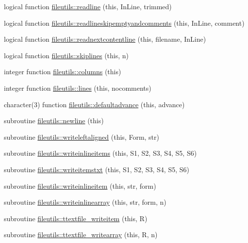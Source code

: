 \begin{DoxyCompactItemize}
\item 
logical function \mbox{\hyperlink{namespacefileutils_affa8ee4edc46a1fcbc9da79877e80724}{fileutils\+::readline}} (this, In\+Line, trimmed)
\item 
logical function \mbox{\hyperlink{namespacefileutils_a8adc28c1f4192183517beb41ccec4287}{fileutils\+::readlineskipemptyandcomments}} (this, In\+Line, comment)
\item 
logical function \mbox{\hyperlink{namespacefileutils_ada6e0a7d8b00d257b6902c5741d737bd}{fileutils\+::readnextcontentline}} (this, filename, In\+Line)
\item 
logical function \mbox{\hyperlink{namespacefileutils_ae9b000065603bdcdab84740b77c43983}{fileutils\+::skiplines}} (this, n)
\item 
integer function \mbox{\hyperlink{namespacefileutils_a91600ec19776dc37a388c71d74c6e0bf}{fileutils\+::columns}} (this)
\item 
integer function \mbox{\hyperlink{namespacefileutils_a55dce72f20c256d70de9529936f7ebd8}{fileutils\+::lines}} (this, nocomments)
\item 
character(3) function \mbox{\hyperlink{namespacefileutils_a8114041129cdfa75aa9d0c0195ff8da1}{fileutils\+::defaultadvance}} (this, advance)
\item 
subroutine \mbox{\hyperlink{namespacefileutils_ae2a0937c572a3a07540ac002f8a620cd}{fileutils\+::newline}} (this)
\item 
subroutine \mbox{\hyperlink{namespacefileutils_a4db10f3a8145e0e4d26416a1718a0c13}{fileutils\+::writeleftaligned}} (this, Form, str)
\item 
subroutine \mbox{\hyperlink{namespacefileutils_acb35071046eb5e751ef36740cc5464f9}{fileutils\+::writeinlineitems}} (this, S1, S2, S3, S4, S5, S6)
\item 
subroutine \mbox{\hyperlink{namespacefileutils_a081a95c89cd56409865919dc2230a9f3}{fileutils\+::writeitemstxt}} (this, S1, S2, S3, S4, S5, S6)
\item 
subroutine \mbox{\hyperlink{namespacefileutils_af26bec360e1e147d731d1265d3b3e689}{fileutils\+::writeinlineitem}} (this, str, form)
\item 
subroutine \mbox{\hyperlink{namespacefileutils_a421b7722f368ba1dbf80589c8f944804}{fileutils\+::writeinlinearray}} (this, str, form, n)
\item 
subroutine \mbox{\hyperlink{namespacefileutils_a0b6a6b2a921c679e8226e4c2b11775d0}{fileutils\+::ttextfile\+\_\+writeitem}} (this, R)
\item 
subroutine \mbox{\hyperlink{namespacefileutils_a8df98772000e2733576f361e197fa37a}{fileutils\+::ttextfile\+\_\+writearray}} (this, R, n)

\end{DoxyCompactItemize}
